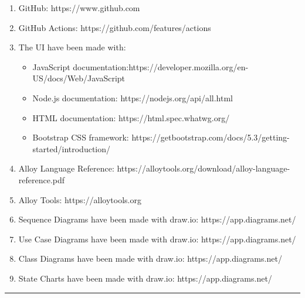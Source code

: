 \begin{enumerate}
    \item GitHub: https://www.github.com
    \item GitHub Actions: https://github.com/features/actions
    \item The UI have been made with:
    \begin{itemize}
    \item JavaScript documentation:https://developer.mozilla.org/en-US/docs/Web/JavaScript 
    \item Node.js documentation: https://nodejs.org/api/all.html
    \item HTML documentation: https://html.spec.whatwg.org/
    \item Bootstrap CSS framework: https://getbootstrap.com/docs/5.3/getting-started/introduction/
    \end{itemize}
    \item Alloy Language Reference: https://alloytools.org/download/alloy-language-reference.pdf
    \item Alloy Tools: https://alloytools.org
    \item Sequence Diagrams have been made with draw.io: https://app.diagrams.net/ 
    \item Use Case Diagrams have been made with draw.io: https://app.diagrams.net/
    \item Class Diagrams have been made with draw.io: https://app.diagrams.net/
    \item State Charts have been made with draw.io: https://app.diagrams.net/
\end{enumerate}

{\color{bluepoli}\rule{\linewidth}{0.1pt}}
